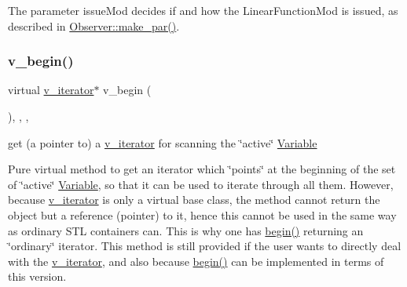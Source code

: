 The parameter issue\+Mod decides if and how the Linear\+Function\+Mod is issued, as described in \mbox{\hyperlink{class_s_m_spp__di__unipi__it_1_1_observer_a2d499ae38e5e95cf66cd71da32b0694a}{Observer\+::make\+\_\+par()}}. \mbox{\label{class_s_m_spp__di__unipi__it_1_1_linear_function_ab1aaddfcb091477a729de24cd07ad9e5}} 
\subsubsection{\texorpdfstring{v\+\_\+begin()}{v\_begin()}\hspace{0.1cm}{\footnotesize\ttfamily [1/2]}}
{\footnotesize\ttfamily virtual \mbox{\hyperlink{class_s_m_spp__di__unipi__it_1_1_linear_function_1_1v__iterator}{v\+\_\+iterator}}$\ast$ v\+\_\+begin (\begin{DoxyParamCaption}\item[{void}]{ }\end{DoxyParamCaption})\hspace{0.3cm}{\ttfamily [inline]}, {\ttfamily [final]}, {\ttfamily [override]}, {\ttfamily [virtual]}}



get (a pointer to) a \mbox{\hyperlink{class_s_m_spp__di__unipi__it_1_1_linear_function_1_1v__iterator}{v\+\_\+iterator}} for scanning the \char`\"{}active\char`\"{} \mbox{\hyperlink{class_s_m_spp__di__unipi__it_1_1_variable}{Variable}} 

Pure virtual method to get an iterator which \char`\"{}points\char`\"{} at the beginning of the set of \char`\"{}active\char`\"{} \mbox{\hyperlink{class_s_m_spp__di__unipi__it_1_1_variable}{Variable}}, so that it can be used to iterate through all them. However, because \mbox{\hyperlink{class_s_m_spp__di__unipi__it_1_1_linear_function_1_1v__iterator}{v\+\_\+iterator}} is only a virtual base class, the method cannot return the object but a reference (pointer) to it, hence this cannot be used in the same way as ordinary S\+TL containers can. This is why one has \mbox{\hyperlink{group___thin_var_dep_interface___c_l_a_s_s_e_s_ga79162df6cbf36b4997db545dc30969e2}{begin()}} returning an \char`\"{}ordinary\char`\"{} iterator. This method is still provided if the user wants to directly deal with the \mbox{\hyperlink{class_s_m_spp__di__unipi__it_1_1_linear_function_1_1v__iterator}{v\+\_\+iterator}}, and also because \mbox{\hyperlink{group___thin_var_dep_interface___c_l_a_s_s_e_s_ga79162df6cbf36b4997db545dc30969e2}{begin()}} can be implemented in terms of this version. 

